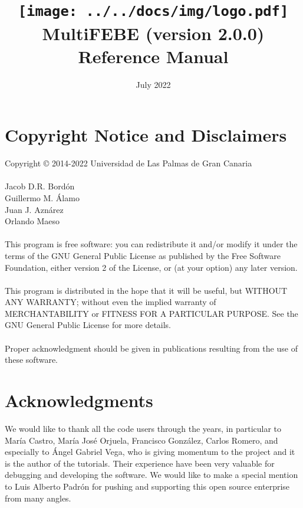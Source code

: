 \documentclass[a4paper,fleqn]{book}
\title{
\texttt{[image: ../../docs/img/logo.pdf]}
\\
MultiFEBE (version 2.0.0)
\\
Reference Manual}
\author{

}
\date{July 2022}
\begin{document}
\maketitle

\cleardoublepage

\chapter*{Copyright Notice and Disclaimers}

\begin{large}
Copyright {\copyright} 2014-2022 Universidad de Las Palmas de Gran Canaria
\\\\
Jacob D.R. Bordón \\ 
Guillermo M. \'Alamo \\
Juan J. Azn\'arez \\
Orlando Maeso
\\\\
This program is free software: you can redistribute it and/or modify it under the terms of the GNU General Public License as published by the Free Software Foundation, either version 2 of the License, or (at your option) any later version.
\\\\
This program is distributed in the hope that it will be useful, but WITHOUT ANY WARRANTY; without even the implied warranty of MERCHANTABILITY or FITNESS FOR A PARTICULAR PURPOSE. See the GNU General Public License for more details.
\\\\
Proper acknowledgment should be given in publications resulting from the use of these software.
\end{large}

\cleardoublepage

\chapter*{Acknowledgments}

We would like to thank all the code users through the years, in particular to María Castro, María José Orjuela, Francisco González, Carlos Romero, and especially to Ángel Gabriel Vega, who is giving momentum to the project and it is the author of the tutorials. Their experience have been very valuable for debugging and developing the software. We would like to make a special mention to Luis Alberto Padrón for pushing and supporting this open source enterprise from many angles.
\end{document}
